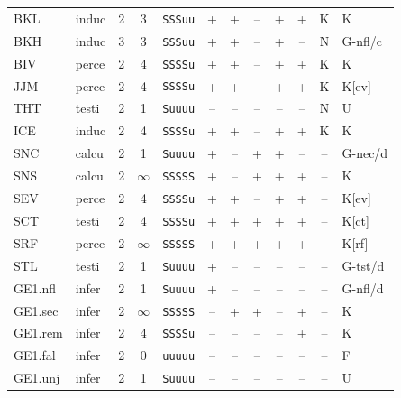 {\begin{longtable}{@{}llcccccccccl@{}}
BKL & induc & 2 & 3 & \texttt{SSSuu} & \textsf{+} & \textsf{+} & \textsf{--} & \textsf{+} & \textsf{+} & K & K \\
BKH & induc & 3 & 3 & \texttt{SSSuu} & \textsf{+} & \textsf{+} & \textsf{--} & \textsf{+} & \textsf{--} & N & G-nfl/c \\
BIV & perce & 2 & 4 & \texttt{SSSSu} & \textsf{+} & \textsf{+} & \textsf{--} & \textsf{+} & \textsf{+} & K & K \\
JJM & perce & 2 & 4 & \texttt{SSSSu} & \textsf{+} & \textsf{+} & \textsf{--} & \textsf{+} & \textsf{+} & K & K[ev] \\
THT & testi & 2 & 1 & \texttt{Suuuu} & \textsf{--} & \textsf{--} & \textsf{--} & \textsf{--} & \textsf{--} & N & U \\
ICE & induc & 2 & 4 & \texttt{SSSSu} & \textsf{+} & \textsf{+} & \textsf{--} & \textsf{+} & \textsf{+} & K & K \\
SNC & calcu & 2 & 1 & \texttt{Suuuu} & \textsf{+} & \textsf{--} & \textsf{+} & \textsf{+} & \textsf{--} & -- & G-nec/d \\
SNS & calcu & 2 & $\infty$ & \texttt{SSSSS} & \textsf{+} & \textsf{--} & \textsf{+} & \textsf{+} & \textsf{+} & -- & K \\
SEV & perce & 2 & 4 & \texttt{SSSSu} & \textsf{+} & \textsf{+} & \textsf{--} & \textsf{+} & \textsf{+} & -- & K[ev] \\
SCT & testi & 2 & 4 & \texttt{SSSSu} & \textsf{+} & \textsf{+} & \textsf{+} & \textsf{+} & \textsf{+} & -- & K[ct] \\
SRF & perce & 2 & $\infty$ & \texttt{SSSSS} & \textsf{+} & \textsf{+} & \textsf{+} & \textsf{+} & \textsf{+} & -- & K[rf] \\
STL & testi & 2 & 1 & \texttt{Suuuu} & \textsf{+} & \textsf{--} & \textsf{--} & \textsf{--} & \textsf{--} & -- & G-tst/d \\
GE1.nfl & infer & 2 & 1 & \texttt{Suuuu} & \textsf{+} & \textsf{--} & \textsf{--} & \textsf{--} & \textsf{--} & -- & G-nfl/d \\
GE1.sec & infer & 2 & $\infty$ & \texttt{SSSSS} & \textsf{--} & \textsf{+} & \textsf{+} & \textsf{--} & \textsf{+} & -- & K \\
GE1.rem & infer & 2 & 4 & \texttt{SSSSu} & \textsf{--} & \textsf{--} & \textsf{--} & \textsf{--} & \textsf{+} & -- & K \\
GE1.fal & infer & 2 & 0 & \texttt{uuuuu} & \textsf{--} & \textsf{--} & \textsf{--} & \textsf{--} & \textsf{--} & -- & F \\
GE1.unj & infer & 2 & 1 & \texttt{Suuuu} & \textsf{--} & \textsf{--} & \textsf{--} & \textsf{--} & \textsf{--} & -- & U \\

\end{longtable}}
